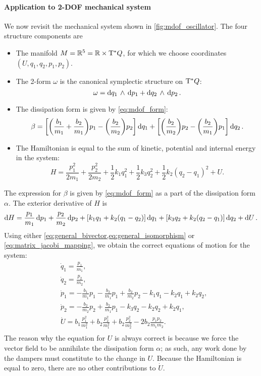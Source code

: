 \paragraph{Application to 2-DOF mechanical system}
We now revisit the mechanical system shown in \cref{fig:mdof_oscillator}. The four structure components are
\begin{itemize}
    \item The manifold $M = \mathbb{R}^5 = \mathbb{R} \times \mathrm{T}^*Q$, for which we choose coordinates $(U, q_1, q_2, p_1, p_2)$.
    \item The 2-form $\omega$ is the canonical symplectic structure on $\mathrm{T}^*Q$:
        $$ \omega =  \dd{q_1}\,\wedge\,\dd{p_1}  +  \dd{q_2}\,\wedge\,\dd{p_2} . $$
    \item The dissipation form is given by \cref{eq:mdof_form}:
        $$ \beta =  \qty[\qty(\frac{b_1}{m_1} + \frac{b_2}{m_1}) p_1 - \qty(\frac{b_2}{m_2})p_2]\dd{q_1}
                          + \qty[\qty(\frac{b_2}{m_2})p_2 - \qty(\frac{b_2}{m_1})p_1]\dd{q_2}.$$
    \item The Hamiltonian is equal to the sum of kinetic, potential and internal energy in the system:
        $$ H = \frac{p^2_1}{2m_1} + \frac{p^2_2}{2m_2} + \frac{1}{2}k_1q_1^2 + \frac{1}{2}k_3q_2^2 + \frac{1}{2}k_2(q_2 - q_1)^2 + U.$$
\end{itemize}

 The expression for $\beta$ is given by \cref{eq:mdof_form} as a part of the dissipation form $\alpha$. The exterior derivative of $H$ is 
     $$ \dd{H} = \frac{p_1}{m_1}\dd{p_1} + \frac{p_2}{m_2}\dd{p_2} +  \qty[k_1q_1 + k_2(q_1 - q_2)]\dd{q_1} + \qty[k_3q_2 + k_2(q_2 - q_1)]\dd{q_2} + \dd{U}.$$
 Using either \cref{eq:general_bivector,eq:general_isomorphism} or \cref{eq:matrix_jacobi_mapping}, we obtain the correct equations of motion for the system:
 \begin{equation}
     \begin{split}
         &\dot{q}_1 = \frac{p_1}{m_1}, \\
         &\dot{q}_2 = \frac{p_2}{m_2}, \\
         &\dot{p}_1 = -\frac{b_1}{m_1}p_1 - \frac{b_2}{m_1}p_1 + \frac{b_2}{m_2}p_2 - k_1 q_1 - k_2 q_1 + k_2 q_2, \\
         &\dot{p}_2 =  - \frac{b_2}{m_2}p_2 + \frac{b_2}{m_1}p_1 - k_3 q_2 - k_2 q_2 + k_2 q_1, \\
         &\dot{U} = b_1\frac{p_1^2}{m_1^2} + b_2\frac{p_2^2}{m_1^2} +  b_2\frac{p_2^2}{m_2^2} - 2b_2 \frac{p_1 p_2}{m_1 m_2}. \\
     \end{split}
     \label{eq:mdof_eom_complete}
 \end{equation}
The reason why the equation for $U$ is always correct is because we force the vector field to be annihilate the dissipation form $\alpha$; as such, any work done by the dampers must constitute to the change in $U$. Because the Hamiltonian is equal to zero, there are no other contributions to $\dot{U}$. 

